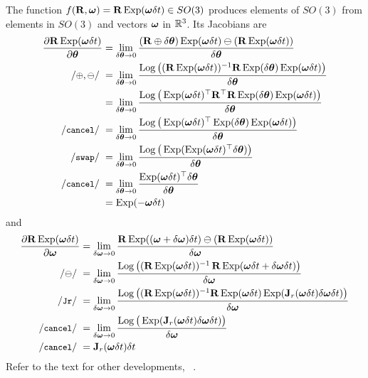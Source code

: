The function $f({\bf R},{{\bm \omega}}) = {\bf R}\operatorname*{Exp}({{\bm \omega}}\delta t)\in SO(3)$ produces elements of $SO(3)$ from elements in $SO(3)$ and vectors ${{\bm \omega}}$ in ${\mathbb R}^3$. Its Jacobians are 
%
\begin{align*}
\dpar{\bfR\Exp(\bw\dt)}{\bth} 
&= \lim_{\delta\bth\to0}\frac{(\bfR\oplus\delta\bth)\Exp(\bw\dt)\ominus(\bfR\Exp(\bw\dt))}{\delta\bth} \\
\com{$\oplus,\ominus$}
&= \lim_{\delta\bth\to0}\frac{\Log\big((\bfR\Exp(\bw\dt))\inv \bfR\Exp(\delta\bth)\Exp(\bw\dt)\big)}{\delta\bth} \\
&= \lim_{\delta\bth\to0}\frac{\Log\big(\Exp(\bw\dt)\tr\bfR\tr \bfR\Exp(\delta\bth)\Exp(\bw\dt)\big)}{\delta\bth} \\
\ccancel
&= \lim_{\delta\bth\to0}\frac{\Log\big(\Exp(\bw\dt)\tr\Exp(\delta\bth)\Exp(\bw\dt)\big)}{\delta\bth} \\
\cswap
&= \lim_{\delta\bth\to0}\frac{\Log\big(\Exp(\Exp(\bw\dt)\tr\delta\bth)\big)}{\delta\bth} \\
\ccancel
&= \lim_{\delta\bth\to0}\frac{\Exp(\bw\dt)\tr\delta\bth}{\delta\bth} \\
&= \Exp(-\bw\dt) 
\end{align*}
%
and
%
\begin{align*}
\dpar{\bfR\Exp(\bw\dt)}{\bw} 
&= \lim_{\delta\bw\to0}\frac{\bfR\Exp((\bw+\delta\bw)\dt) \ominus (\bfR\Exp(\bw\dt)) }{\delta\bw} \\
\com{$\ominus$}
&= \lim_{\delta\bw\to0}\frac{\Log\big((\bfR\Exp(\bw\dt))\inv \, \bfR\Exp(\bw\dt+\delta\bw\dt)\big)}{\delta\bw} \\
\cJr
&= \lim_{\delta\bw\to0}\frac{\Log\big((\bfR\Exp(\bw\dt))\inv \bfR\Exp(\bw\dt)\Exp(\bfJ_r(\bw\dt)\delta\bw\dt)\big)}{\delta\bw} \\
\ccancel
&= \lim_{\delta\bw\to0}\frac{\Log\big(\Exp(\bfJ_r(\bw\dt)\delta\bw\dt)\big)}{\delta\bw} \\
\com{cancel}
&= \bfJ_r(\bw\dt)\dt
\end{align*}
%
%
Refer to the text for other developments, \eg~.



